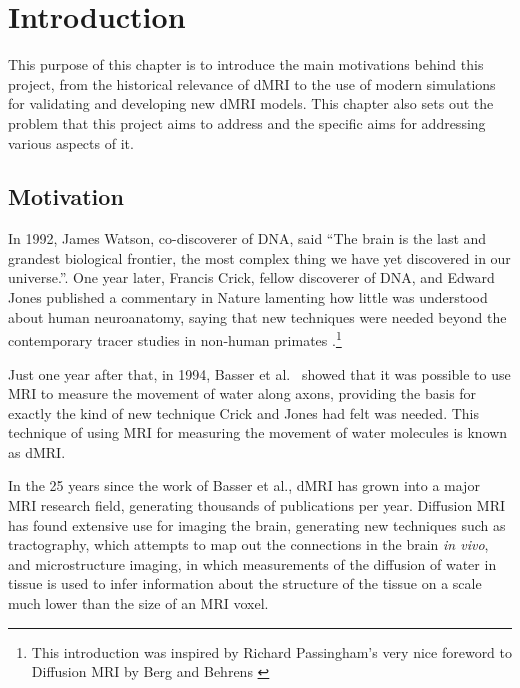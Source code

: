 \renewcommand{\LifeChapter}{y}
\chapter{Introduction}
\label{chap:introduction}

\chaptertoc{}

\begin{chapterabstract}
  This purpose of this chapter is to introduce the main motivations behind this project, from the historical relevance of \acl{dMRI} to the use of modern simulations for validating and developing new \acl{dMRI} models.
  This chapter also sets out the problem that this project aims to address and the specific aims for addressing various aspects of it.
\end{chapterabstract}

\section{Motivation}
\label{sec:intro_motivation}
In 1992, James Watson, co-discoverer of DNA, said ``The brain is the last and grandest biological frontier, the most complex thing we have yet discovered in our universe.''\cite{NAP1785}.
One year later, Francis Crick, fellow discoverer of DNA, and Edward Jones published a commentary in Nature lamenting how little was understood about human neuroanatomy, saying that new techniques were needed beyond the contemporary tracer studies in non-human primates \cite{Crick1993}.\footnote{This introduction was inspired by Richard Passingham's very nice foreword to Diffusion MRI by Berg and Behrens \cite{Johansen-Berg2013}}

Just one year after that, in 1994, Basser et al.\ \cite{Basser1994} showed that it was possible to use \ac{MRI} to measure the movement of water along axons, providing the basis for exactly the kind of new technique Crick and Jones had felt was needed.
This technique of using \ac{MRI} for measuring the movement of water molecules is known as \ac{dMRI}.

In the 25 years since the work of Basser et al., \acl{dMRI} has grown into a major \ac{MRI} research field, generating thousands of publications per year.
Diffusion MRI has found extensive use for imaging the brain, generating new techniques such as tractography, which attempts to map out the connections in the brain \emph{in vivo}, and microstructure imaging, in which measurements of the diffusion of water in tissue is used to infer information about the structure of the tissue on a scale much lower than the size of an MRI voxel.

